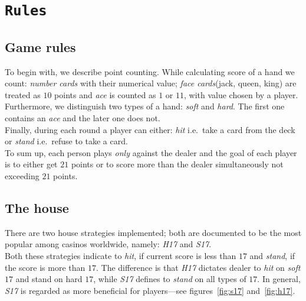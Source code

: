 \documentclass[12pt,a4paper,twocolumn]{article}
\begin{document}
\section*{\texttt{Rules}}
\subsection*{Game rules}
To begin with, we describe point counting. While calculating score of a hand we count: \emph{number cards} with their numerical value; \emph{face cards}(jack, queen, king) are treated as $10$ points and \emph{ace} is counted as $1$ or $11$, with value chosen by a player.\\
Furthermore, we distinguish two types of a hand: \emph{soft} and \emph{hard}. The first one contains an \emph{ace} and the later one does not.\\
Finally, during each round a player can either: \emph{hit} i.e.\ take a card from the deck or \emph{stand} i.e.\ refuse to take a card.\\

To sum up, each person plays \emph{only} against the dealer and the goal of each player is to either get $21$ points or to score more than the dealer simultaneously not exceeding $21$ points.\\

\subsection*{The house}
There are two house strategies implemented; both are documented to be the most popular among casinos worldwide, namely: \emph{H17} and \emph{S17}.\\
Both these strategies indicate to \emph{hit}, if current score is less than $17$ and \emph{stand}, if the score is more than $17$. The difference is that \emph{H17} dictates dealer to \emph{hit} on \emph{soft} $17$ and stand on hard $17$, while \emph{S17} defines to \emph{stand} on all types of $17$. In general, \emph{S17} is regarded as more beneficial for players---see figures~\ref{fig:s17} and~\ref{fig:h17}.\\
\end{document}
